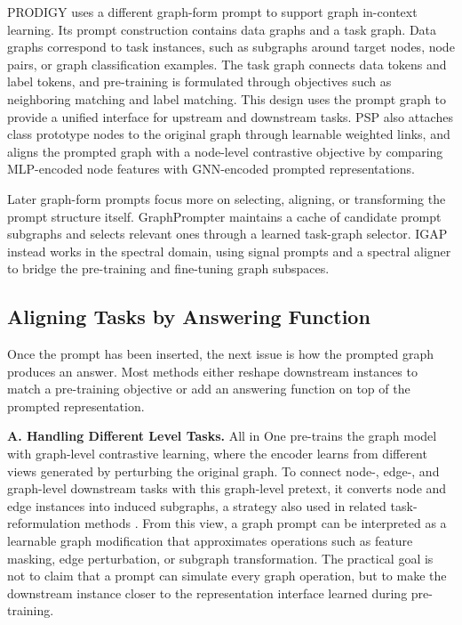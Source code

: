 PRODIGY \cite{huang2023prodigy} uses a different graph-form prompt to support graph in-context learning. Its prompt construction contains data graphs and a task graph. Data graphs correspond to task instances, such as subgraphs around target nodes, node pairs, or graph classification examples. The task graph connects data tokens and label tokens, and pre-training is formulated through objectives such as neighboring matching and label matching. This design uses the prompt graph to provide a unified interface for upstream and downstream tasks. PSP \cite{ge2024psp} also attaches class prototype nodes to the original graph through learnable weighted links, and aligns the prompted graph with a node-level contrastive objective by comparing MLP-encoded node features with GNN-encoded prompted representations.

Later graph-form prompts focus more on selecting, aligning, or transforming the prompt structure itself. GraphPrompter \cite{lv2025graphprompter} maintains a cache of candidate prompt subgraphs and selects relevant ones through a learned task-graph selector. IGAP \cite{yan2024igap} instead works in the spectral domain, using signal prompts and a spectral aligner to bridge the pre-training and fine-tuning graph subspaces.


\subsection{Aligning Tasks by Answering Function}\label{subsec:align}

\textit{ }

Once the prompt has been inserted, the next issue is how the prompted graph produces an answer. Most methods either reshape downstream instances to match a pre-training objective or add an answering function on top of the prompted representation.

\textbf{A. Handling Different Level Tasks.} 
All in One \cite{sun2023all} pre-trains the graph model with graph-level contrastive learning, where the encoder learns from different views generated by perturbing the original graph. To connect node-, edge-, and graph-level downstream tasks with this graph-level pretext, it converts node and edge instances into induced subgraphs, a strategy also used in related task-reformulation methods \cite{huang2023prodigy,liu2023graphprompt}. From this view, a graph prompt can be interpreted as a learnable graph modification that approximates operations such as feature masking, edge perturbation, or subgraph transformation. The practical goal is not to claim that a prompt can simulate every graph operation, but to make the downstream instance closer to the representation interface learned during pre-training.


